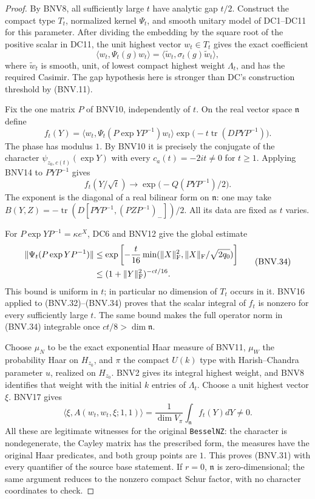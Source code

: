 \begin{proof}
By BNV8, all sufficiently large $t$ have analytic gap $t/2$.
Construct the compact type $T_t$, normalized kernel $\Psi_t$, and
smooth unitary model of DC1--DC11 for this parameter.  After dividing
the embedding by the square root of the positive scalar in DC11,
the unit highest vector $w_t\in T_t$ gives the exact coefficient
\[
 \langle w_t,\Psi_t(g)w_t\rangle
    =\langle\widetilde w_t,\sigma_t(g)\widetilde w_t\rangle,
\]
where $\widetilde w_t$ is smooth, unit, of lowest compact highest weight
$\Lambda_t$, and has the required Casimir.  The gap hypothesis here
is stronger than DC's construction threshold by (BNV.11).

Fix the one matrix $P$ of BNV10, independently of $t$.
On the real vector space $\mathfrak n$ define
\[
 f_t(Y)=\langle w_t,\Psi_t(P\exp YP^{-1})w_t\rangle
       \exp\bigl(-t\operatorname{tr}(DPYP^{-1})\bigr).
 \tag{BNV.32}
\]
The phase has modulus $1$.  By BNV10 it is precisely the conjugate
of the character $\psi_{z_0,c(t)}(\exp Y)$ with every
$c_a(t)=-2it\ne0$ for $t\ge1$.  Applying BNV14 to $PYP^{-1}$ gives
\[
 f_t(Y/\sqrt t)\longrightarrow
     \exp\bigl(-Q(PYP^{-1})/2\bigr).
 \tag{BNV.33}
\]
The exponent is the diagonal of a real bilinear form on $\mathfrak n$:
one may take
$B(Y,Z)=-\operatorname{tr}(D[PYP^{-1},(PZP^{-1})_-])/2$.
All its data are fixed as $t$ varies.

For $P\exp YP^{-1}=\kappa e^X$, DC6 and BNV12 give the global estimate
\[
 \begin{split}
 \|\Psi_t(P\exp YP^{-1})\|
 &\le\exp\left[-\frac{t}{16}
       \min(\|X\|_{\rm F}^2,\|X\|_{\rm F}/\sqrt{2q_0})\right]\\
 &\le(1+\|Y\|_{\rm F}^2)^{-ct/16}.
 \end{split}
 \tag{BNV.34}
\]
This bound is uniform in $t$; in particular no dimension of $T_t$
occurs in it.  BNV16 applied to (BNV.32)--(BNV.34) proves that the
scalar integral of $f_t$ is nonzero for every sufficiently large $t$.
The same bound makes the full operator norm in (BNV.34) integrable
once $ct/8>\dim\mathfrak n$.

Choose $\mu_N$ to be the exact exponential Haar measure of BNV11,
$\mu_W$ the probability Haar on $H_{z_0}$, and $\pi$ the compact
$U(k)$ type with Harish--Chandra parameter $u$, realized on $H_{z_0}$.
BNV2 gives its integral highest weight, and BNV8 identifies that
weight with the initial $k$ entries of $\Lambda_t$.
Choose a unit highest vector $\xi$.  BNV17 gives
\[
 \langle\xi,A(w_t,w_t,\xi;1,1)\rangle
       =\frac1{\dim V_\pi}\int_{\mathfrak n}f_t(Y)dY\ne0.
\]
All these are legitimate witnesses for the original \texttt{BesselNZ}:
the character is nondegenerate, the Cayley matrix has the prescribed
form, the measures have the original Haar predicates, and both group
points are $1$.  This proves (BNV.31) with every quantifier of the
source base statement.  If $r=0$, $\mathfrak n$ is zero-dimensional;
the same argument reduces to the nonzero compact Schur factor, with
no character coordinates to check.
\end{proof}

